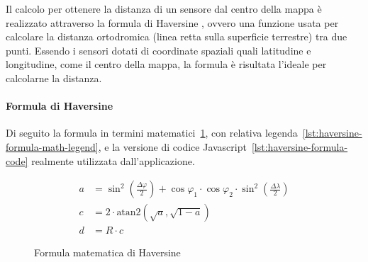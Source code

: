 

Il calcolo per ottenere la distanza di un sensore dal centro della mappa è realizzato attraverso
la formula di Haversine \cite{haversine_formula}, ovvero una funzione usata per calcolare la distanza ortodromica
(linea retta sulla superficie terrestre) tra due punti. Essendo i sensori dotati di coordinate spaziali
quali latitudine e longitudine, come il centro della mappa, la formula è risultata l'ideale per calcolarne la distanza.

\paragraph{Formula di Haversine}

Di seguito la formula in termini matematici~\ref{lst:haversine-formula-math},
con relativa legenda~\ref{lst:haversine-formula-math-legend}, e la versione
di codice Javascript~\ref{lst:haversine-formula-code} realmente utilizzata dall'applicazione.

\begin{figure}[h]
  \begin{align}
    a & = \sin^2\left(\frac{\Delta\varphi}{2}\right) + \cos\varphi_1 \cdot \cos\varphi_2 \cdot \sin^2\left(\frac{\Delta\lambda}{2}\right) \\
    c & = 2 \cdot \text{atan2}\left(\sqrt{a}, \sqrt{1-a}\right)                                                                           \\
    d & = R \cdot c
  \end{align}
  \caption{Formula matematica di Haversine}
  \label{lst:haversine-formula-math}
\end{figure}

